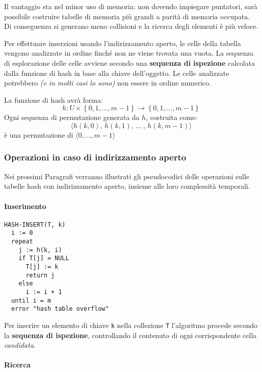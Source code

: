 \documentclass[italian, 10pt]{article}
\begin{document}
Il vantaggio sta nel minor uso di memoria: non dovendo impiegare puntatori, sarà possibile costruire tabelle di memoria più grandi a parità di memoria occupata.
Di conseguenza si generano meno collisioni e la ricerca degli elementi è più veloce.

Per effettuare inserzioni usando l'indirizzamento aperto, le celle della tabella vengono analizzate in ordine finché non ne viene trovata una vuota.
La sequenza di esplorazione delle celle avviene secondo una \textbf{sequenza di ispezione} calcolata dalla funzione di hash in base alla chiave dell'oggetto.
Le celle analizzate potrebbero \textit{(e in molti casi lo sono)} non essere in ordine numerico.

La funzione di hash avrà forma:
\[ h: U \times \left\{0, 1, \ldots, m-1\right\} \rightarrow \left\{0, 1, \ldots, m-1\right\} \]
Ogni sequenza di permutazione generata da \(h\), costruita come:
\[\langle h(k, 0),\, h(k, 1),\, \ldots\ ,\, h(k, m-1)  \rangle\]
è una permutazione di \(\langle 0, \ldots, m-1\rangle\)

\subsubsection{Operazioni in caso di indirizzamento aperto}

Nei prossimi Paragrafi verranno illustrati gli pseudocodici delle operazioni sulle tabelle hash con indirizzamento aperto, insieme alle loro complessità temporali.

\paragraph{Inserimento}

\begin{lstlisting}[style=pseudocode, caption={Pseudocodice dell'algoritmo \texttt{HASH-INSERT}}, label={sec:inserimento-ind-aperto}]
HASH-INSERT(T, k)
  i := 0
  repeat
    j := h(k, i)
    if T[j] = NULL
      T[j] := k
      return j
    else
      i := i + 1
  until i = m
  error "hash table overflow"
\end{lstlisting}

Per inserire un elemento di chiave \texttt{k} nella collezione \texttt{T} l'algoritmo procede secondo la \textbf{sequenza di ispezione}, controllando il contenuto di ogni corrispondente cella \textit{candidata}.

\paragraph{Ricerca}
\end{document}
